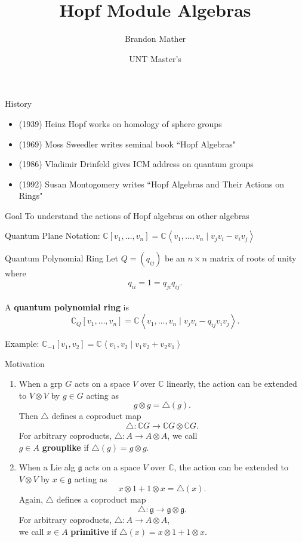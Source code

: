 \documentclass{beamer}
\title{Hopf Module Algebras}
\author{Brandon Mather}
\date{UNT Master's}
\begin{document}
\maketitle

\begin{frame}{History}
    \begin{itemize}\setlength{\itemindent}{-2ex}
        \item (1939) Heinz Hopf works on homology of sphere groups
        \item (1969) Moss Sweedler writes seminal book ``Hopf Algebras"
        \item (1986) Vladimir Drinfeld gives ICM address on quantum groups
        \item (1992) Susan Montogomery writes ``Hopf Algebras and Their Actions on Rings"
    \end{itemize}
    \begin{block}{Goal}
        To understand the actions of Hopf algebras on other algebras
    \end{block}
\end{frame}

\begin{frame}{Quantum Plane}
    Notation: $\mathbb{C}[v_1,\ldots,v_n]=\mathbb{C}\left\langle v_1,\ldots,v_n\;\vert\; v_jv_i-v_iv_j\right\rangle$
    \begin{block}{Quantum Polynomial Ring}
        Let $Q=(q_{ij})$ be an $n\times n$ matrix of roots of unity where \[q_{ii}=1=q_{ji}q_{ij}.\]
        \\
        A \textbf{quantum polynomial ring} is \[\mathbb{C}_Q[v_1,\ldots,v_n]=\mathbb{C}\left\langle v_1,\ldots,v_n \;\vert\; v_jv_i-q_{ij}v_iv_j\right\rangle.\]
    \end{block}
    Example: $\mathbb{C}_{-1}[v_1,v_2]=\mathbb{C}\left\langle v_1,v_2\;\vert\; v_1 v_2+v_2 v_1\right\rangle$
\end{frame}

\begin{frame}{Motivation}
\begin{enumerate}\setlength{\itemindent}{-2ex}
    \item<1-> When a grp $G$ acts on a space $V$ over $\mathbb{C}$ linearly, the action can be extended to $V\otimes V$ by $g\in G$ acting as \[g\otimes g=\triangle(g).\] 
     Then $\triangle$ defines a coproduct map \[\triangle:\mathbb{C}G\to\mathbb{C}G\otimes\mathbb{C}G.\]
     For arbitrary coproducts, $\triangle:A\to A\otimes A$, we call\\ $g\in A$ \textbf{grouplike} if $\triangle(g)=g\otimes g$.
    \item<2-> When a Lie alg $\mathfrak{g}$ acts on a space $V$ over $\mathbb{C}$, the action can be extended to $V\otimes V$ by $x\in\mathfrak{g}$ acting as \[x\otimes 1+1\otimes x=\triangle(x).\]
      Again, $\triangle$ defines a coproduct map \[\triangle:\mathfrak{g}\to\mathfrak{g}\otimes\mathfrak{g}.\]
      For arbitrary coproducts, $\triangle:A\to A\otimes A$,\\ we call $x\in A$ \textbf{primitive} if $\triangle(x)=x\otimes 1+1\otimes x$.
\end{enumerate}
\vspace{0.5cm}
\end{frame}
\end{document}
